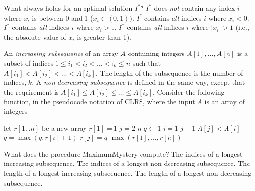 \medskip

\noindent
What always holds for an optimal solution $I^*$?
\multipleanswers
\optionsstart
\answer $I^*$ does \emph{not} contain any index $i$ where $x_i$ is between 0 and 1 ($x_i\in (0,1))$. \correct
\answer $I^*$ contains \emph{all} indices $i$ where $x_i < 0$.
\answer $I^*$ contains \emph{all} indices $i$ where $x_i > 1$. \correct
\answer $I^*$ contains \emph{all} indices $i$ where $|x_i| > 1$ (i.e., the absolute value of $x_i$ is greater than 1).
\optionsend
{}



An \emph{increasing subsequence} of an array $A$ containing integers $A[1],\dots,A[n]$ is a subset of indices $1\leq i_1 < i_2 < \dots < i_k \leq n$ such that $A[i_1] < A[i_2] < \dots < A[i_k]$.
The length of the subsequence is the number of indices, $k$.
A \emph{non-decreasing subsequence} is defined in the same way, except that the requirement is $A[i_1] \leq A[i_2] \leq \dots \leq A[i_k]$.
Consider the following function, in the pseudocode notation of CLRS, where the input $A$ is an array of integers.
\begin{codebox}
  \li let $r[1\dots n]$ be a new array
  \li $r[1] = 1$
  \li \For $j = 2$ \To $n$
  \li \Do $q \gets 1$
  \li \For $i=1$ \To $j-1$
  \li \Do {} $A[j] < A[i]$
  \li \Then $q = \max(q, r[i] + 1)$ \End\End
  \li $r[j]=q$ \End
  \li \Return $\max(r[1],\dots,r[n])$
\end{codebox}

\noindent
What does the procedure {\sc MaximumMystery} compute?
\oneanswer
\optionsstart
\answer The indices of a longest increasing subsequence.
\answer The indices of a longest non-decreasing subsequence.
\answer The length of a longest increasing subsequence.
\answer The length of a longest non-decreasing subsequence. \correct
\optionsend

